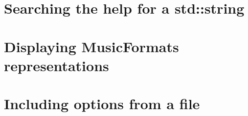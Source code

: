 \section{Searching the help for a std::string}


\section{Displaying MusicFormats representations}


\section{Including options from a file}



